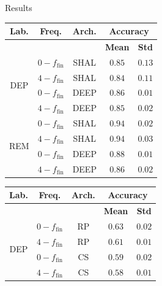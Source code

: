 \documentclass{beamer}
\begin{document}

\begin{frame}{Results}
\begin{table}[tbp]
\centering
\scriptsize
  \parbox{0.495\linewidth}{
\centering
\begin{tabular}{|c|c|c|c|c|}
\hline
\textbf{Lab.} & \textbf{Freq.} & \textbf{Arch.} & \multicolumn{2}{c}{\textbf{Accuracy}} \vline \\ \hline
& & & \textbf{Mean} & \textbf{Std} \\ \hline
\multirow{4}{*}{DEP} & $0-f_{\text{fin}}$ & SHAL &  $0.85$ & $0.13$    \\ \cline{2-5}
                     & $4-f_{\text{fin}}$ & SHAL &     $0.84$ & $0.11$    \\ \cline{2-5} 
                     & $0-f_{\text{fin}}$ & DEEP &     $\mathbf{0.86}$ & $0.01$    \\ \cline{2-5} 
                     & $4-f_{\text{fin}}$ & DEEP &     $0.85$ & $0.02$    \\ \hline
\multirow{4}{*}{REM} & $0-f_{\text{fin}}$ & SHAL &  $\mathbf{0.94}$ & $0.02$    \\ \cline{2-5} 
                     & $4-f_{\text{fin}}$ & SHAL &     $0.94$ & $0.03$    \\ \cline{2-5} 
                     & $0-f_{\text{fin}}$ & DEEP &     $0.88$ & $0.01$    \\ \cline{2-5} 
                     & $4-f_{\text{fin}}$ & DEEP &     $0.86$ & $0.02$    \\ \hline
\end{tabular}
}
\hfill
  \parbox{0.495\linewidth}{
\centering
\begin{tabular}{|c|c|c|c|c|}
\hline
\textbf{Lab.} & \textbf{Freq.} & \textbf{Arch.} & \multicolumn{2}{c}{\textbf{Accuracy}} \vline \\ \hline
& & & \textbf{Mean} & \textbf{Std} \\ \hline
\multirow{4}{*}{DEP} & $0-f_{\text{fin}}$ & RP &   $\mathbf{0.63}$ & $0.02$ \\ \cline{2-5}      
                     & $4-f_{\text{fin}}$ & RP &      $0.61$ & $0.01$   \\ \cline{2-5}             
                     & $0-f_{\text{fin}}$ & CS &      $0.59$ & $0.02$  \\ \cline{2-5}              
                     & $4-f_{\text{fin}}$ & CS &      $0.58$ & $0.01$ \\ \hline

\end{tabular}}
\end{table}
\end{frame}
\end{document}
